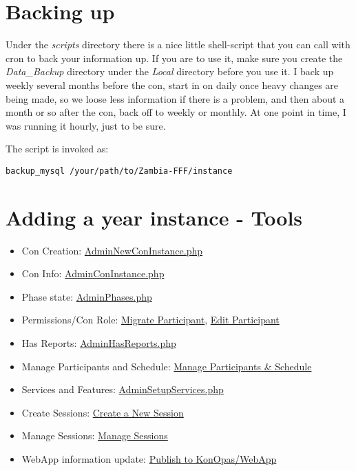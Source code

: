 \documentclass[captions=tablesignature]{scrartcl}
\begin{document}
\section{Backing up}
\label{sec-9}
Under the \emph{scripts} directory there is a nice little shell-script
that you can call with cron to back your information up.  If you are
to use it, make sure you create the \emph{Data\_Backup} directory under
the \emph{Local} directory before you use it.  I back up weekly several
months before the con, start in on daily once heavy changes are
being made, so we loose less information if there is a problem, and
then about a month or so after the con, back off to weekly or
monthly.  At one point in time, I was running it hourly, just to be
sure.

The script is invoked as:
\begin{verbatim}
backup_mysql /your/path/to/Zambia-FFF/instance
\end{verbatim}

\section{Adding a year instance - Tools}
\label{sec-10}
\begin{itemize}
\item Con Creation: \href{../webpages/AdminNewConInstance.php}{AdminNewConInstance.php}
\item Con Info: \href{../webpages/AdminConInstance.php}{AdminConInstance.php}
\item Phase state: \href{../webpages/AdminPhases.php}{AdminPhases.php}
\item Permissions/Con Role: \href{../webpages/StaffEditCreateParticipant.php?action=migrate}{Migrate Participant}, \href{../webpages/StaffEditCreateParticipant.php?action=edit}{Edit Participant}
\item Has Reports: \href{../webpages/AdminHasReports.php}{AdminHasReports.php}
\item Manage Participants and Schedule: \href{../webpages/StaffManageParticipants.php}{Manage Participants \& Schedule}
\item Services and Features: \href{../webpages/AdminSetupServices.php}{AdminSetupServices.php}
\item Create Sessions: \href{../webpages/CreateSession.php}{Create a New Session}
\item Manage Sessions: \href{../webpages/StaffManageSessions.php}{Manage Sessions}
\item WebApp information update: \href{../webpages/KonOpasData.php}{Publish to KonOpas/WebApp}
\end{itemize}
\end{document}
